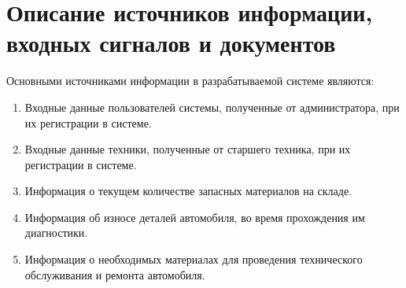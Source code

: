 \documentclass[../nirs.tex]{subfiles}
\begin{document}
\section{Описание источников информации, входных сигналов и документов}
Основными источниками информации в разрабатываемой системе являются:
\begin{enumerate}
	\item Входные данные пользователей системы, полученные от администратора,
		при их регистрации в системе.
    \item Входные данные техники, полученные от старшего техника, при их
		регистрации в системе.
	\item Информация о текущем количестве запасных материалов на складе.
	\item Информация об износе деталей автомобиля, во время прохождения им
        диагностики.
	\item Информация о необходимых материалах для проведения технического
        обслуживания и ремонта автомобиля.
\end{enumerate}
\end{document}
